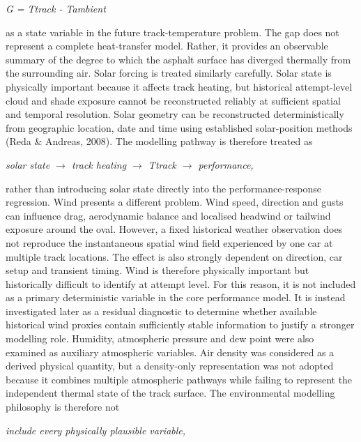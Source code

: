 \begin{center}\textit{G = Ttrack - Tambient}\end{center}

as a state variable in the future track-temperature problem. The gap does not represent a complete heat-transfer model. Rather, it provides an observable summary of the degree to which the asphalt surface has diverged thermally from the surrounding air. Solar forcing is treated similarly carefully. Solar state is physically important because it affects track heating, but historical attempt-level cloud and shade exposure cannot be reconstructed reliably at sufficient spatial and temporal resolution. Solar geometry can be reconstructed deterministically from geographic location, date and time using established solar-position methods (Reda \& Andreas, 2008). The modelling pathway is therefore treated as

\begin{center}\textit{solar state \ensuremath{\rightarrow} track heating \ensuremath{\rightarrow} Ttrack \ensuremath{\rightarrow} performance,}\end{center}

rather than introducing solar state directly into the performance-response regression. Wind presents a different problem. Wind speed, direction and gusts can influence drag, aerodynamic balance and localised headwind or tailwind exposure around the oval. However, a fixed historical weather observation does not reproduce the instantaneous spatial wind field experienced by one car at multiple track locations. The effect is also strongly dependent on direction, car setup and transient timing. Wind is therefore physically important but historically difficult to identify at attempt level. For this reason, it is not included as a primary deterministic variable in the core performance model. It is instead investigated later as a residual diagnostic to determine whether available historical wind proxies contain sufficiently stable information to justify a stronger modelling role. Humidity, atmospheric pressure and dew point were also examined as auxiliary atmospheric variables. Air density was considered as a derived physical quantity, but a density-only representation was not adopted because it combines multiple atmospheric pathways while failing to represent the independent thermal state of the track surface. The environmental modelling philosophy is therefore not

\begin{center}\textit{include every physically plausible variable,}\end{center}

